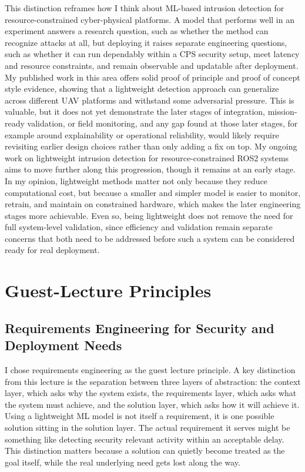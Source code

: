 \documentclass[11pt,a4paper]{article}
\begin{document}
This distinction reframes how I think about ML-based intrusion detection for resource-constrained cyber-physical platforms. A model that performs well in an experiment answers a research question, such as whether the method can recognize attacks at all, but deploying it raises separate engineering questions, such as whether it can run dependably within a CPS security setup, meet latency and resource constraints, and remain observable and updatable after deployment. My published work in this area offers solid proof of principle and proof of concept style evidence, showing that a lightweight detection approach can generalize across different UAV platforms and withstand some adversarial pressure. This is valuable, but it does not yet demonstrate the later stages of integration, mission-ready validation, or field monitoring, and any gap found at those later stages, for example around explainability or operational reliability, would likely require revisiting earlier design choices rather than only adding a fix on top. My ongoing work on lightweight intrusion detection for resource-constrained ROS2 systems aims to move further along this progression, though it remains at an early stage. In my opinion, lightweight methods matter not only because they reduce computational cost, but because a smaller and simpler model is easier to monitor, retrain, and maintain on constrained hardware, which makes the later engineering stages more achievable. Even so, being lightweight does not remove the need for full system-level validation, since efficiency and validation remain separate concerns that both need to be addressed before such a system can be considered ready for real deployment.


\section{Guest-Lecture Principles}

\subsection{Requirements Engineering for Security and Deployment Needs}

I chose requirements engineering as the guest lecture principle. A key distinction from this lecture is the separation between three layers of abstraction: the context layer, which asks why the system exists, the requirements layer, which asks what the system must achieve, and the solution layer, which asks how it will achieve it. Using a lightweight ML model is not itself a requirement, it is one possible solution sitting in the solution layer. The actual requirement it serves might be something like detecting security relevant activity within an acceptable delay. This distinction matters because a solution can quietly become treated as the goal itself, while the real underlying need gets lost along the way.
\end{document}
